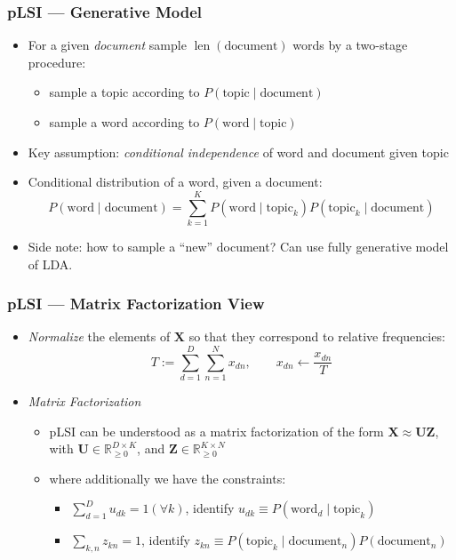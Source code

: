 \documentclass[conference,11pt]{IEEEtran}
\newcommand{\matr}[1]{\boldsymbol{\mathbf{#1}}}
\DeclareMathOperator{\len}{len}
\newcommand{\R}{\mathbb{R}}
\begin{document}
\subsubsection{pLSI --- Generative Model}
\begin{itemize}
  \item For a given \emph{document} sample \emph{$\len(\mathrm{document})$}
    words by a two-stage procedure:
    \begin{itemize}
      \item sample a topic according to $P(\mathrm{topic}\mid\mathrm{document})$
      \item sample a word according to $P(\mathrm{word}\mid\mathrm{topic})$
    \end{itemize}
  \item Key assumption: \emph{conditional independence} of word and document
    given topic
  \item Conditional distribution of a word, given a document:
    \[
      P(\mathrm{word}\mid\mathrm{document}) = \sum_{k=1}^K P(\mathrm{word}\mid
      \mathrm{topic}_k) P(\mathrm{topic}_k \mid \mathrm{document})
    \]
  \item Side note: how to sample a ``new'' document? Can use fully generative
    model of LDA.\@
\end{itemize}

\subsubsection{pLSI --- Matrix Factorization View}
\begin{itemize}
  \item \emph{Normalize} the elements of $\matr{X}$ so that they correspond to
    relative frequencies:
    \[
      T := \sum_{d=1}^D \sum_{n=1}^N x_{dn}, \qquad x_{dn}\gets\frac{x_{dn}}{T}
    \]
  \item \emph{Matrix Factorization}
    \begin{itemize}
      \item pLSI can be understood as a matrix factorization of the form
        $\matr{X}\approx\matr{U}\matr{Z}$, with $\matr{U}\in\R_{\geq 0}^{D
          \times K}$, and $\matr{Z}\in\R_{\geq 0}^{K \times N}$
      \item where additionally we have the constraints:
        \begin{itemize}
          \item $\sum_{d=1}^D u_{dk} = 1 (\forall k)$, identify $u_{dk} \equiv
            P(\mathrm{word}_d \mid \mathrm{topic}_k)$
          \item $\sum_{k,n} z_{kn} = 1$, identify $z_{kn} \equiv
            P(\mathrm{topic}_k \mid \mathrm{document}_n) P(\mathrm{document}_n)$
        \end{itemize}
    \end{itemize}
\end{itemize}
\end{document}

